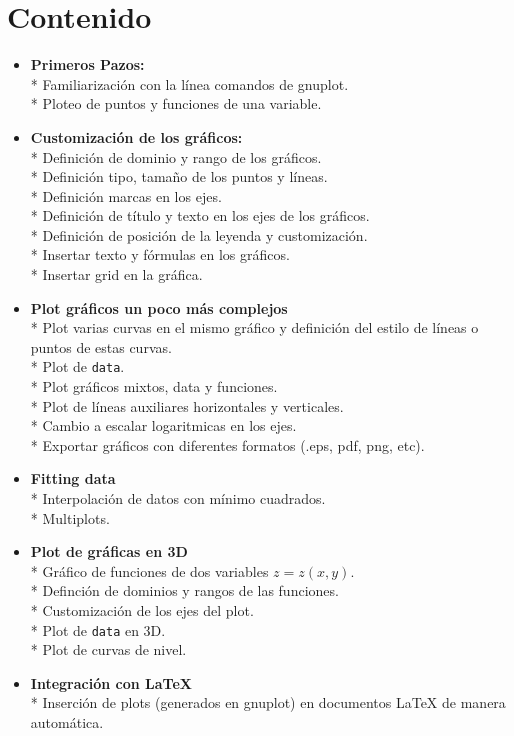 \documentclass[11.5pt,a4paper]{article}
\begin{document}
\newpage
\section{Contenido}

\begin{itemize}
\item \textbf{Primeros Pazos:}\\* 
Familiarización con la línea comandos de gnuplot.\\*
Ploteo de puntos y funciones de una variable.

\item \textbf{Customización de los gráficos:}\\*
Definición de dominio y rango de los gráficos.\\*
Definición tipo, tamaño de los puntos y líneas.\\*
Definición marcas en los ejes.\\*
Definición de título y texto en los ejes de los gráficos.\\*
Definición de posición de la leyenda y customización.\\*
Insertar texto y fórmulas en los gráficos.\\*
Insertar grid en la gráfica.

\item \textbf{Plot gráficos un poco más complejos}\\*
Plot varias curvas en el mismo gráfico y definición del estilo de líneas o puntos de estas curvas.\\*
Plot de \texttt{data}.\\*
Plot gráficos mixtos, data y funciones.\\*
Plot de líneas auxiliares horizontales y verticales.\\*
Cambio a escalar logaritmicas en los ejes.\\*
Exportar gráficos con diferentes formatos (.eps, pdf, png, etc).

\item \textbf{Fitting data}\\*
Interpolación de datos con mínimo cuadrados.\\*
Multiplots.

\item \textbf{Plot de gráficas en 3D}\\*
Gráfico de funciones de dos variables $z = z(x,y)$.\\*
Definción de dominios y rangos de las funciones.\\*
Customización de los ejes del plot.\\*
Plot de \texttt{data} en 3D.\\*
Plot de curvas de nivel.

\item \textbf{Integración con LaTeX}\\*
Inserción de plots (generados en gnuplot) en documentos LaTeX de manera automática.

\end{itemize}
\end{document}
